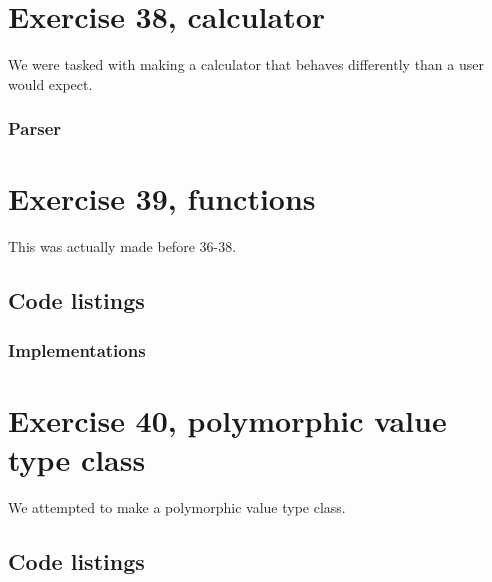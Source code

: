 \documentclass[11pt]{article}
\begin{document}
\section*{Exercise 38, calculator}
We were tasked with making a calculator that behaves differently than a user would expect.

\subsubsection*{Parser}



\section*{Exercise 39, functions}
This was actually made before 36-38.

\subsection*{Code listings}



\subsubsection*{Implementations}












\section*{Exercise 40, polymorphic value type class}
We attempted to make a polymorphic value type class.

\subsection*{Code listings}
\end{document}

